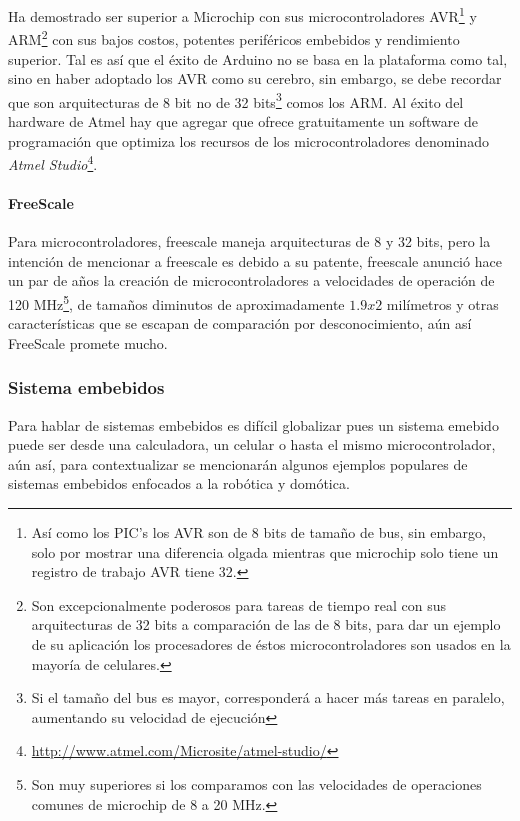 \documentclass{article}
\begin{document}
Ha demostrado ser superior a Microchip con sus microcontroladores 
AVR\footnote{Así como los PIC's los AVR son de 8 bits
de tamaño de bus, sin embargo, solo por mostrar una diferencia olgada
 mientras que microchip solo tiene un registro de trabajo AVR tiene 32.} y ARM\footnote{Son excepcionalmente poderosos para tareas de tiempo real
		 con sus arquitecturas de 32 bits a comparación de las de 8 bits,
 para dar un ejemplo de su aplicación los procesadores de éstos 
 microcontroladores son usados en la mayoría de celulares.} con sus bajos
 costos, potentes periféricos embebidos y rendimiento superior. Tal es así
 que el éxito de Arduino no se basa en la plataforma como tal, sino en 
 haber adoptado los AVR como su cerebro, sin embargo, se debe recordar que
 son arquitecturas de 8 bit no de 32 bits\footnote{Si el tamaño del bus
		 es mayor, corresponderá a hacer más tareas en paralelo, aumentando
 su velocidad de ejecución} comos los ARM. Al éxito del hardware de Atmel
 hay que agregar que ofrece gratuitamente un software de programación
 que optimiza los recursos de los microcontroladores denominado 
 \textit{Atmel Studio}\footnote{\url{http://www.atmel.com/Microsite/atmel-studio/}}. 

\paragraph{FreeScale}

Para microcontroladores, freescale maneja arquitecturas de 8 y 32 bits, pero
la intención de mencionar a freescale es debido a su patente, freescale
anunció hace un par de años la creación de microcontroladores a velocidades
de operación de 120 MHz\footnote{Son muy superiores si los comparamos con
las velocidades de operaciones comunes de microchip de 8 a 20 MHz.}, de 
tamaños diminutos de aproximadamente $1.9 x 2$ milímetros y otras 
características que se escapan de comparación por desconocimiento, aún así
FreeScale promete mucho.

\subsubsection{Sistema embebidos}

Para hablar de sistemas embebidos es difícil globalizar pues un sistema
emebido puede ser desde una calculadora, un celular o hasta el mismo 
microcontrolador, aún así, para contextualizar se mencionarán algunos
ejemplos populares de sistemas embebidos enfocados a la robótica y domótica.
\end{document}
